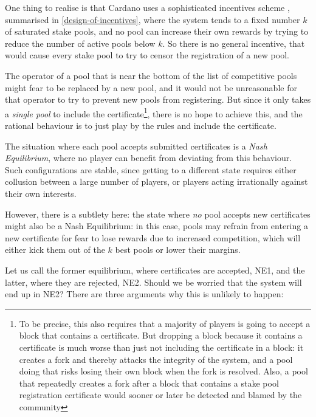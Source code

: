 \documentclass[11pt,a4paper,dvipsnames,twosided]{article}
\newcommand{\citep}[1]{\cite{#1}}
\begin{document}
One thing to realise is that Cardano uses a sophisticated incentives scheme
\citep{bkks2018}, summarised in \cref{design-of-incentives}, where the system
tends to a fixed number \(k\) of saturated stake pools, and no pool can increase
their own rewards by trying to reduce the number of active pools below \(k\). So
there is no general incentive, that would cause every stake pool to try to
censor the registration of a new pool.

The operator of a pool that is near the bottom of the list of competitive pools
might fear to be replaced by a new pool, and it would not be unreasonable for
that operator to try to prevent new pools from registering. But since it only
takes a \emph{single pool} to include the certificate\footnote{%
  To be precise, this also requires that a majority of players is going to
  accept a block that contains a certificate. But dropping a block because it
  contains a certificate is much worse than just not including the certificate
  in a block: it creates a fork and thereby attacks the integrity of the system,
  and a pool doing that risks losing their own block when the fork is resolved.
  Also, a pool that repeatedly creates a fork after a block that contains a
  stake pool registration certificate would sooner or later be detected and
  blamed by the community},%
there is no hope to achieve this, and the rational behaviour is to just play by
the rules and include the certificate.

The situation where each pool accepts submitted certificates is a \emph{Nash
  Equilibrium}, where no player can benefit from deviating from this behaviour.
Such configurations are stable, since getting to a different state requires
either collusion between a large number of players, or players acting
irrationally against their own interests.

However, there is a subtlety here: the state where \emph{no} pool accepts new
certificates might also be a Nash Equilibrium: in this case, pools may refrain
from entering a new certificate for fear to lose rewards due to increased
competition, which will either kick them out of the \(k\) best pools or lower
their margins.

Let us call the former equilibrium, where certificates are accepted, NE1, and
the latter, where they are rejected, NE2. Should we be worried that the system
will end up in NE2? There are three arguments why this is unlikely to happen:
\end{document}
